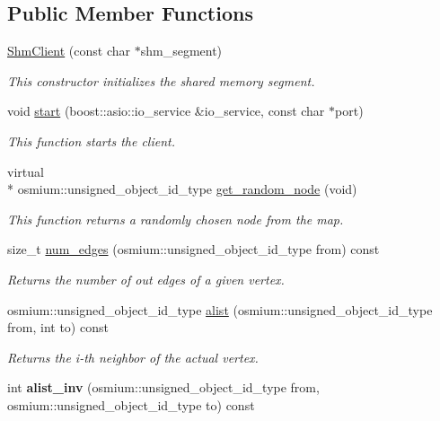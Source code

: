 \subsection*{Public Member Functions}
\begin{DoxyCompactItemize}
\item 
\hyperlink{classjustine_1_1sampleclient_1_1ShmClient_a7b12c596ecc920351b2c12bbfeeee7e2}{Shm\-Client} (const char $\ast$shm\-\_\-segment)
\begin{DoxyCompactList}\small\item\em This constructor initializes the shared memory segment. \end{DoxyCompactList}\item 
void \hyperlink{classjustine_1_1sampleclient_1_1ShmClient_a7a88330a12e2a0cbfbfabae4891b3021}{start} (boost\-::asio\-::io\-\_\-service \&io\-\_\-service, const char $\ast$port)
\begin{DoxyCompactList}\small\item\em This function starts the client. \end{DoxyCompactList}\item 
virtual \\*
osmium\-::unsigned\-\_\-object\-\_\-id\-\_\-type \hyperlink{classjustine_1_1sampleclient_1_1ShmClient_aa4c2f16ec6d72aec8070c683d5b789be}{get\-\_\-random\-\_\-node} (void)
\begin{DoxyCompactList}\small\item\em This function returns a randomly chosen node from the map. \end{DoxyCompactList}\item 
size\-\_\-t \hyperlink{classjustine_1_1sampleclient_1_1ShmClient_a959359ddb659c32f1f65253e2359ea4f}{num\-\_\-edges} (osmium\-::unsigned\-\_\-object\-\_\-id\-\_\-type from) const 
\begin{DoxyCompactList}\small\item\em Returns the number of out edges of a given vertex. \end{DoxyCompactList}\item 
osmium\-::unsigned\-\_\-object\-\_\-id\-\_\-type \hyperlink{classjustine_1_1sampleclient_1_1ShmClient_a35581aba18f1c16b440dd50e84dc7715}{alist} (osmium\-::unsigned\-\_\-object\-\_\-id\-\_\-type from, int to) const 
\begin{DoxyCompactList}\small\item\em Returns the i-\/th neighbor of the actual vertex. \end{DoxyCompactList}\item 
\hypertarget{classjustine_1_1sampleclient_1_1ShmClient_a652b7137db56feb4de93ffce057ffbf9}{int {\bfseries alist\-\_\-inv} (osmium\-::unsigned\-\_\-object\-\_\-id\-\_\-type from, osmium\-::unsigned\-\_\-object\-\_\-id\-\_\-type to) const }\label{classjustine_1_1sampleclient_1_1ShmClient_a652b7137db56feb4de93ffce057ffbf9}


\end{DoxyCompactItemize}
